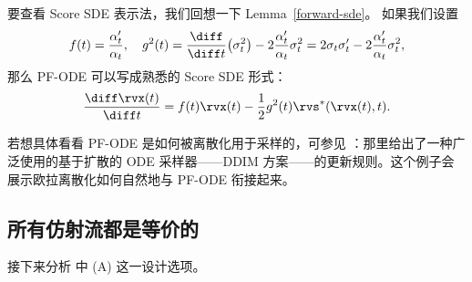 要查看 Score SDE 表示法，我们回想一下 Lemma~\ref{forward-sde}。  如果我们设置
\[
f(t) = \frac{\alpha_t'}{\alpha_t},
\quad
g^2(t) = \frac{\diff}{\diff t} \big(\sigma_t^2\big)
         - 2 \frac{\alpha_t'}{\alpha_t} \sigma_t^2
       = 2\sigma_t\sigma_t' - 2 \frac{\alpha_t'}{\alpha_t} \sigma_t^2,
\]
那么 PF-ODE 可以写成熟悉的 Score SDE 形式：
\[
\frac{\diff \rvx(t)}{\diff t}
= f(t) \rvx(t)  -  \frac{1}{2} g^2(t) \rvs^*(\rvx(t),t).
\]

若想具体看看 PF-ODE 是如何被离散化用于采样的，可参见 ：那里给出了一种广泛使用的基于扩散的 ODE 采样器——DDIM 方案——的更新规则。这个例子会展示欧拉离散化如何自然地与 PF-ODE 衔接起来。


\subsection{所有仿射流都是等价的}\label{subsec:all-flows-are-equiv}
接下来分析  中 (A) 这一设计选项。

